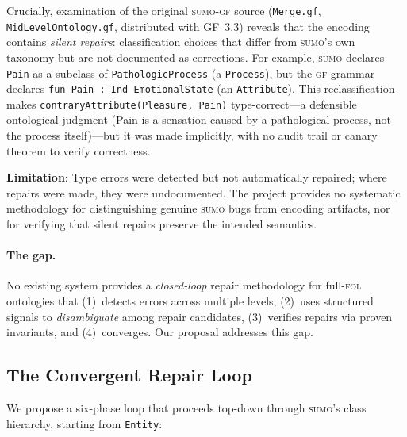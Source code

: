 \documentclass[11pt]{article}
\newcommand{\SUMO}{\textsc{sumo}}
\newcommand{\GF}{\textsc{gf}}
\newcommand{\FOL}{\textsc{fol}}
\theoremstyle{definition}
\theoremstyle{plain}
\begin{document}
Crucially, examination of the original \SUMO{}-\GF{} source
(\texttt{Merge.gf}, \texttt{MidLevelOntology.gf}, distributed with
GF~3.3) reveals that the encoding contains \emph{silent repairs}:
classification choices that differ from \SUMO{}'s own taxonomy but
are not documented as corrections.  For example, \SUMO{} declares
\texttt{Pain} as a subclass of \texttt{PathologicProcess} (a
\texttt{Process}), but the \GF{} grammar declares
\texttt{fun Pain : Ind EmotionalState} (an \texttt{Attribute}).
This reclassification makes \texttt{contraryAttribute(Pleasure, Pain)}
type-correct---a defensible ontological judgment (Pain is a sensation
caused by a pathological process, not the process itself)---but it
was made implicitly, with no audit trail or canary theorem to verify
correctness.

\textbf{Limitation}: Type errors were detected but not automatically
repaired; where repairs were made, they were undocumented.  The project
provides no systematic methodology for distinguishing genuine \SUMO{}
bugs from encoding artifacts, nor for verifying that silent repairs
preserve the intended semantics.

\paragraph{The gap.}
No existing system provides a \emph{closed-loop} repair methodology
for full-\FOL{} ontologies that (1)~detects errors across multiple
levels, (2)~uses structured signals to \emph{disambiguate} among repair
candidates, (3)~verifies repairs via proven invariants, and
(4)~converges.  Our proposal addresses this gap.

\subsection{The Convergent Repair Loop}
\label{sec:repair-loop}

We propose a six-phase loop that proceeds top-down through \SUMO{}'s
class hierarchy, starting from \texttt{Entity}:
\end{document}
